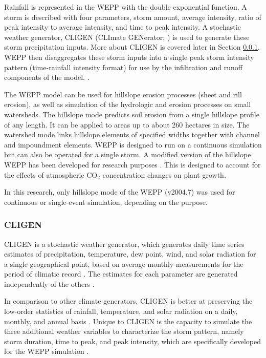 Rainfall is represented in the WEPP with the double exponential function. A
storm is described with four parameters, storm amount, average intensity, ratio
of peak intensity to average intensity, and time to peak intensity. A stochastic
weather generator, CLIGEN (CLImate GENerator; \citealp{nicks1995-2}) is used to
generate these storm precipitation inputs. More about CLIGEN is covered later in
Section \ref{sec:ClimateGeneratorCLIGEN}. WEPP then disaggregates these storm
inputs into a single peak storm intensity pattern (time-rainfall intensity
format) for use by the infiltration and runoff components of the model.
\citep{flanagan1995-usda}.

The WEPP model can be used for hillslope erosion processes (sheet and rill
erosion), as well as simulation of the hydrologic and erosion processes on small
watersheds. The hillslope mode predicts soil erosion from a single hillslope
profile of any length. It can be applied to areas up to about 260 hectares in
size. The watershed mode links hillslope elements of specified widths together
with channel and impoundment elements. WEPP is designed to run on a continuous
simulation but can also be operated for a single storm. A modified version of
the hillslope WEPP has been developed for research purposes
\citep{favis1999-329,favis1996-529}. This is designed to account for the effects
of atmospheric CO$_2$ concentration changes on plant growth.

In this research, only hillslope mode of the WEPP (v2004.7) was used for
continuous or single-event simulation, depending on the purpose.

\subsubsection{CLIGEN}
\label{sec:ClimateGeneratorCLIGEN}
CLIGEN is a stochastic weather generator, which generates daily time series
estimates of precipitation, temperature, dew point, wind, and solar radiation
for a single geographical point, based on average monthly measurements for the
period of climatic record \citep{nicks1995-2}. The estimates for each parameter
are generated independently of the others \citep{nicks1995-2}.

In comparison to other climate generators, CLIGEN is better at preserving the
low-order statistics of rainfall, temperature, and solar radiation on a daily,
monthly, and annual basis \citep{nicks1995-2}. Unique to CLIGEN is the capacity
to simulate the three additional weather variables to characterize the storm
pattern, namely storm duration, time to peak, and peak intensity, which are
specifically developed for the WEPP simulation \citep{flanagan1995-usda}.

